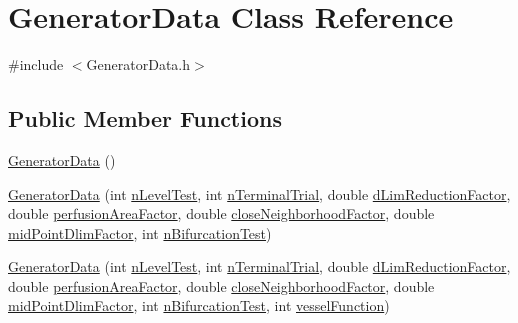 \hypertarget{class_generator_data}{}\section{Generator\+Data Class Reference}
\label{class_generator_data}


{\ttfamily \#include $<$Generator\+Data.\+h$>$}

\subsection*{Public Member Functions}
\begin{DoxyCompactItemize}
\item 
\hyperlink{class_generator_data_a2139ba478921f17df9746651bdccb8c4}{Generator\+Data} ()
\item 
\hyperlink{class_generator_data_ac742af7a1f2b46c18cb9edc59ae7192b}{Generator\+Data} (int \hyperlink{class_generator_data_a124d5f0d59bdcd90fcd69b640d9af05f}{n\+Level\+Test}, int \hyperlink{class_generator_data_a0f4cff730a9b1fb2b237fc4610da2ff0}{n\+Terminal\+Trial}, double \hyperlink{class_generator_data_ace303215d8d8fc30af68e3c578806d80}{d\+Lim\+Reduction\+Factor}, double \hyperlink{class_generator_data_acc6d373f481e41d082eb6f63786804e3}{perfusion\+Area\+Factor}, double \hyperlink{class_generator_data_aa7461e75da07157a1fafbc30a12dce03}{close\+Neighborhood\+Factor}, double \hyperlink{class_generator_data_a9241df122476b5e2449ce4542e5b0e68}{mid\+Point\+Dlim\+Factor}, int \hyperlink{class_generator_data_a3c848d7e7f5f26fdefe582709ca14eb4}{n\+Bifurcation\+Test})
\item 
\hyperlink{class_generator_data_a56f2a003ea63fe1dc900b95a635762f2}{Generator\+Data} (int \hyperlink{class_generator_data_a124d5f0d59bdcd90fcd69b640d9af05f}{n\+Level\+Test}, int \hyperlink{class_generator_data_a0f4cff730a9b1fb2b237fc4610da2ff0}{n\+Terminal\+Trial}, double \hyperlink{class_generator_data_ace303215d8d8fc30af68e3c578806d80}{d\+Lim\+Reduction\+Factor}, double \hyperlink{class_generator_data_acc6d373f481e41d082eb6f63786804e3}{perfusion\+Area\+Factor}, double \hyperlink{class_generator_data_aa7461e75da07157a1fafbc30a12dce03}{close\+Neighborhood\+Factor}, double \hyperlink{class_generator_data_a9241df122476b5e2449ce4542e5b0e68}{mid\+Point\+Dlim\+Factor}, int \hyperlink{class_generator_data_a3c848d7e7f5f26fdefe582709ca14eb4}{n\+Bifurcation\+Test}, int \hyperlink{class_generator_data_aaba3940733d99f383a09279694885dfd}{vessel\+Function})
\item 

\end{DoxyCompactItemize}
